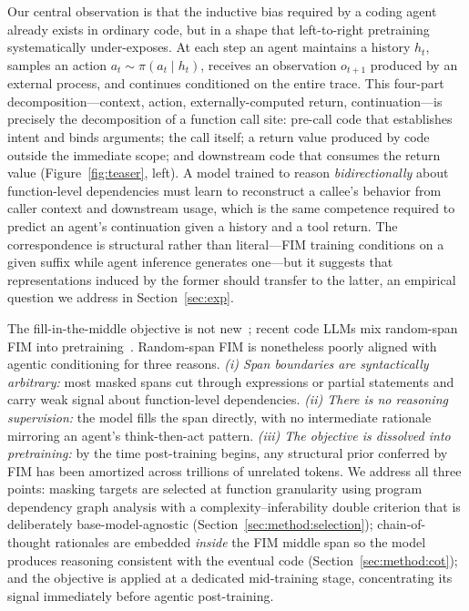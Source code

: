 Our central observation is that the inductive bias required by a coding
agent already exists in ordinary code, but in a shape that left-to-right
pretraining systematically under-exposes. At each step an agent maintains a
history $h_t$, samples an action $a_t \sim \pi(a_t \mid h_t)$, receives an
observation $o_{t+1}$ produced by an external process, and continues
conditioned on the entire trace. This four-part decomposition---context,
action, externally-computed return, continuation---is precisely the
decomposition of a function call site: pre-call code that establishes intent
and binds arguments; the call itself; a return value produced by code
outside the immediate scope; and downstream code that consumes the return
value (Figure~\ref{fig:teaser}, left). A model trained to reason
\emph{bidirectionally} about function-level dependencies must learn to
reconstruct a callee's behavior from caller context and downstream usage,
which is the same competence required to predict an agent's continuation
given a history and a tool return. The correspondence is structural rather
than literal---FIM training conditions on a given suffix while agent
inference generates one---but it suggests that representations induced by
the former should transfer to the latter, an empirical question we address
in Section~\ref{sec:exp}.

The fill-in-the-middle objective is not new~\citep{bavarian2022fim};
recent code LLMs mix random-span FIM into pretraining~\citep{qwencoder,
deepseekcoder, starcoder}. Random-span FIM is nonetheless poorly aligned
with agentic conditioning for three reasons. \emph{(i) Span boundaries
are syntactically arbitrary:} most masked spans cut through expressions
or partial statements and carry weak signal about function-level
dependencies. \emph{(ii) There is no reasoning supervision:} the model
fills the span directly, with no intermediate rationale mirroring an
agent's think-then-act pattern. \emph{(iii) The objective is dissolved
into pretraining:} by the time post-training begins, any structural prior
conferred by FIM has been amortized across trillions of unrelated tokens.
We address all three points: masking targets are selected at function
granularity using program dependency graph analysis with a
complexity--inferability double criterion that is deliberately
base-model-agnostic (Section~\ref{sec:method:selection}); chain-of-thought
rationales are embedded \emph{inside} the FIM middle span so the model
produces reasoning consistent with the eventual code
(Section~\ref{sec:method:cot}); and the objective is applied at a
dedicated mid-training stage, concentrating its signal immediately before
agentic post-training.

